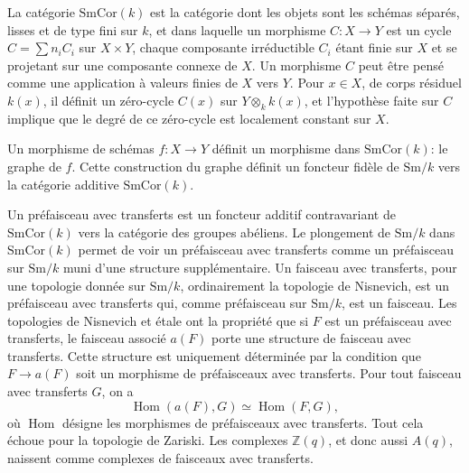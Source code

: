 \documentclass[11pt]{article}
\newcommand{\Z}{\mathbb Z}
\newcommand{\Sm}{\mathrm{Sm}}
\newcommand{\SmCor}{\mathrm{SmCor}}
\newcommand{\Hom}{\operatorname{Hom}}
\theoremstyle{deligne}
\newcommand{\heading}[1]{\vspace{0.7em}\noindent{\bfseries #1}\quad}
\begin{document}
\heading{1.3.} La catégorie \(\SmCor(k)\) est la catégorie dont les objets sont les schémas séparés, lisses et de type fini sur \(k\), et dans laquelle un morphisme \(C:X\to Y\) est un cycle \(C=\sum n_iC_i\) sur \(X\times Y\), chaque composante irréductible \(C_i\) étant finie sur \(X\) et se projetant sur une composante connexe de \(X\). Un morphisme \(C\) peut être pensé comme une application à valeurs finies de \(X\) vers \(Y\). Pour \(x\in X\), de corps résiduel \(k(x)\), il définit un zéro-cycle \(C(x)\) sur \(Y\otimes_k k(x)\), et l'hypothèse faite sur \(C\) implique que le degré de ce zéro-cycle est localement constant sur \(X\).

Un morphisme de schémas \(f:X\to Y\) définit un morphisme dans \(\SmCor(k)\): le graphe de \(f\). Cette construction du graphe définit un foncteur fidèle de \(\Sm/k\) vers la catégorie additive \(\SmCor(k)\).

Un préfaisceau avec transferts est un foncteur additif contravariant de \(\SmCor(k)\) vers la catégorie des groupes abéliens. Le plongement de \(\Sm/k\) dans \(\SmCor(k)\) permet de voir un préfaisceau avec transferts comme un préfaisceau sur \(\Sm/k\) muni d'une structure supplémentaire. Un faisceau avec transferts, pour une topologie donnée sur \(\Sm/k\), ordinairement la topologie de Nisnevich, est un préfaisceau avec transferts qui, comme préfaisceau sur \(\Sm/k\), est un faisceau. Les topologies de Nisnevich et étale ont la propriété que si \(F\) est un préfaisceau avec transferts, le faisceau associé \(a(F)\) porte une structure de faisceau avec transferts. Cette structure est uniquement déterminée par la condition que \(F\to a(F)\) soit un morphisme de préfaisceaux avec transferts. Pour tout faisceau avec transferts \(G\), on a
\[
  \Hom(a(F),G)\simeq \Hom(F,G),
\]
où \(\Hom\) désigne les morphismes de préfaisceaux avec transferts. Tout cela échoue pour la topologie de Zariski. Les complexes \(\Z(q)\), et donc aussi \(A(q)\), naissent comme complexes de faisceaux avec transferts.
\end{document}
